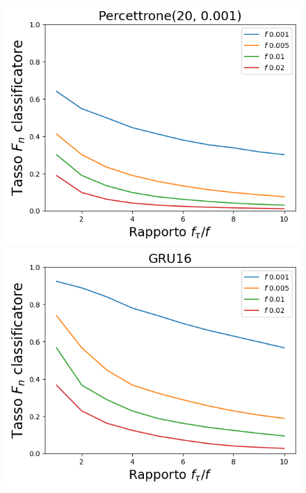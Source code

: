 \documentclass{beamer}
\begin{document}
\begin{frame}
\begin{figure}[htbp]
        \centering
        \begin{minipage}{0.25\textwidth}
        \centering
        \includegraphics[width=\textwidth]{immagini/7/SLBF/Percettrone(20, 0.001)_FNR.png}
        \end{minipage}%
        \hfill
        \begin{minipage}{0.25\textwidth}
        \centering
        \includegraphics[width=\textwidth]{immagini/7/SLBF/GRU16_FNR.png}
        \end{minipage}%
        \hfill
        \begin{minipage}{0.25\textwidth}

\end{minipage}
\end{figure}
\end{frame}
\end{document}
